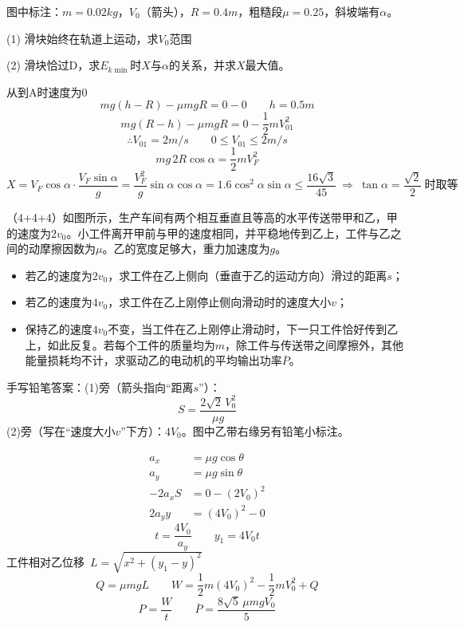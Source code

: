 图中标注：$m=0.02\unit{kg}$，$V_0$（箭头），$R=0.4\unit{m}$，粗糙段$\mu=0.25$，斜坡端有$\alpha$。
\begin{problem}
(1) 滑块始终在轨道上运动，求$V_0$范围

(2) 滑块恰过D，求$E_{k\min}$时$X$与$\alpha$的关系，并求$X$最大值。
\begin{solution}
从到A时速度为0
\[
mg(h-R)-\mu mgR=0-0\qquad h=0.5\unit{m}
\]
\[
mg(R-h)-\mu mgR=0-\frac{1}{2}mV_{01}^2 %
\]
\[
\therefore V_{01}=2\unit{m/s}\qquad 0\le V_{01}\le2\unit{m/s}
\]
\[
mg\,2R\cos\alpha=\frac{1}{2}mV_F^2
\]
\[
X=V_F\cos\alpha\cdot\frac{V_F\sin\alpha}{g}=\frac{V_F^2}{g}\sin\alpha\cos\alpha=1.6\cos^2\alpha\sin\alpha\le\frac{16\sqrt3}{45}\ \Rightarrow\ \tan\alpha=\frac{\sqrt2}{2}\ \text{时取等}
\]
\end{solution}
\end{problem}
\begin{problem}[贴纸印刷题]
（4+4+4）如图所示，生产车间有两个相互垂直且等高的水平传送带甲和乙，甲的速度为$2v_0$。小工件离开甲前与甲的速度相同，并平稳地传到乙上，工件与乙之间的动摩擦因数为$\mu$。乙的宽度足够大，重力加速度为$g$。
\begin{itemize}
\item[(1)] 若乙的速度为$2v_0$，求工件在乙上侧向（垂直于乙的运动方向）滑过的距离$s$；
\item[(2)] 若乙的速度为$4v_0$，求工件在乙上刚停止侧向滑动时的速度大小$v$；
\item[(3)] 保持乙的速度$4v_0$不变，当工件在乙上刚停止滑动时，下一只工件恰好传到乙上，如此反复。若每个工件的质量均为$m$，除工件与传送带之间摩擦外，其他能量损耗均不计，求驱动乙的电动机的平均输出功率$\overline{P}$。
\end{itemize}


手写铅笔答案：(1)旁（箭头指向“距离$s$”）：
\[
S=\frac{2\sqrt2\,V_0^2}{\mu g}
\]
(2)旁（写在“速度大小$v$”下方）：$4V_0$。图中乙带右缘另有铅笔小标注。

\begin{solution}
\begin{align*}
a_x&=\mu g\cos\theta\\
a_y&=\mu g\sin\theta\\
-2a_xS&=0-(2V_0)^2\\
2a_yy&=(4V_0)^2-0
\end{align*}
\[
t=\frac{4V_0}{a_y}\qquad y_1=4V_0t
\]
工件相对乙位移\ $L=\sqrt{x^2+(y_1-y)^2}$
\[
Q=\mu mgL\qquad W=\frac{1}{2}m(4V_0)^2-\frac{1}{2}mV_0^2+Q
\] %
\[
P=\frac{W}{t}\qquad \overline{P}=\frac{8\sqrt5\,\mu mgV_0}{5}
\]
\end{solution}
\end{problem}
